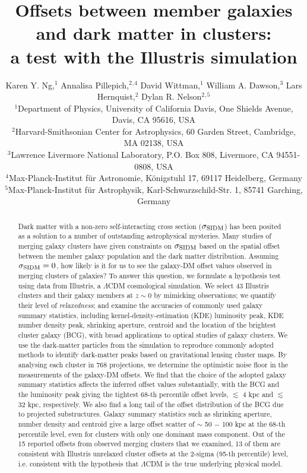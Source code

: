 \documentclass[usenatbib]{mn2e}
\title[	Galaxy-DM offsets in Illustris clusters]
{Offsets between member galaxies and dark matter in clusters:\\ 
a test with the Illustris simulation}
\author[Karen Y. Ng et al.]{Karen Y. Ng,$^1$
	Annalisa Pillepich,$^2$$^,$$^4$ 
	David Wittman,$^1$
	William A. Dawson,$^3$ 
	\newauthor Lars Hernquist,$^{2}$
	Dylan R. Nelson$^{2}$$^,$$^5$ \\ 
$^{1}$Department of Physics, University of California Davis, One Shields
Avenue, Davis, CA 95616, USA\\ 
$^{2}$Harvard-Smithsonian Center for Astrophysics, 60 Garden Street, Cambridge,
MA 02138, USA\\
$^{3}$Lawrence Livermore National Laboratory, P.O. Box 808, Livermore, CA 94551-0808, USA \\
$^{4}$Max-Planck-Institut f{\"u}r Astronomie, K{\"o}nigstuhl 17, 69117 Heidelberg, Germany\\
$^{5}$Max-Planck-Institut f{\"u}r Astrophysik, Karl-Schwarzschild-Str. 1, 85741 Garching, Germany\\}
\begin{document}
\pagerange{\pageref{firstpage}--\pageref{lastpage}}
 \maketitle\label{firstpage}
\begin{abstract} 
	Dark matter with a non-zero self-interacting cross section ($\sigma_{\rm
	SIDM}$) has been posited
	as a solution to a number of outstanding astrophysical mysteries.
	Many studies of merging galaxy clusters have given constraints on
	$\sigma_{\rm SIDM}$ based on the spatial offset between the member galaxy
	population and the dark matter distribution.      
	Assuming $\sigma_{\rm SIDM} = 0$, how likely is
	it for us to see the galaxy-DM offset values observed in merging clusters of galaxies? 
	To answer this question, we formulate a hypothesis test using data from Illustris, a $\Lambda$CDM cosmological 
	simulation.
	We select 43 Illustris clusters and their galaxy members at $z\sim0$ by mimicking observations; 
	we quantify their level of {\it relaxedness}; and examine the accuracies of commonly used galaxy summary 
	statistics, including kernel-density-estimation (KDE) luminosity peak, KDE number density peak, shrinking aperture, centroid and
	the location of the brightest cluster galaxy (BCG), with broad applications to optical studies of
	galaxy clusters.
	We use the dark-matter particles from the simulation to reproduce commonly adopted methods to identify dark-matter peaks based on gravitational lensing cluster maps. By analysing each cluster in 768 projections, we determine the optimistic noise floor in the measurements of the galaxy-DM offsets. We find that the choice of the adopted galaxy summary statistics affects the inferred offset
	values substantially, with the BCG and the luminosity peak giving the tightest
	68-th percentile offset levels, $\lesssim$ 4 kpc and $\lesssim$ 32 kpc, respectively. We also find a long
	tail of the offset distribution of the BCG due to projected 
	substructures. Galaxy summary statistics such as
	shrinking aperture, number density and centroid give a large offset scatter of $\sim$ 50
	$-$ 100 kpc at	the 68-th percentile level, even for clusters with only one dominant 
	mass component.
	Out of the 15 reported offsets from observed merging clusters
	that we examined, 13 of them are consistent with Illustris unrelaxed cluster offsets at the 2-sigma (95-th percentile) level, i.e. consistent with the hypothesis that $\Lambda$CDM is the true underlying physical model. 
	
\end{abstract}
\end{document}

